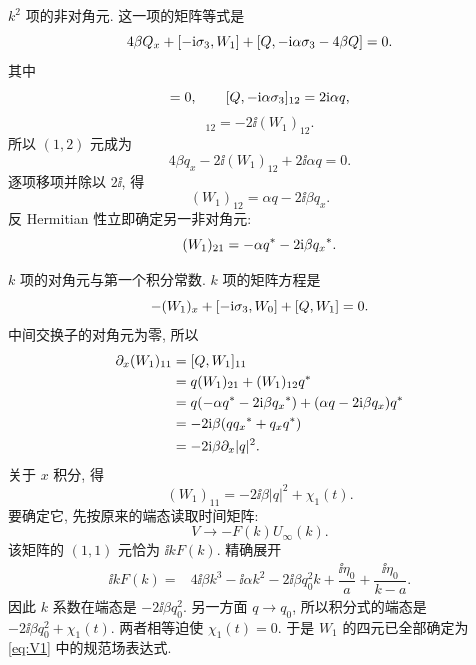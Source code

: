 \par\smallskip\noindent $k^2$ 项的非对角元.\quad
这一项的矩阵等式是
\begin{equation*}
4\beta Q_x+[-\mathrm{i}\sigma_3,W_1]+[Q,-\mathrm{i}\alpha\sigma_3-4\beta Q]=0.
\end{equation*}
其中
\begin{equation*}
[Q,-4\beta Q]=0,\qquad
[Q,-\ii\alpha\sg]_{12}=2\ii\alpha q,
\end{equation*}
\begin{equation*}
[-\ii\sg,W_1]_{12}=-2\ii(W_1)_{12}.
\end{equation*}
所以 $(1,2)$ 元成为
\begin{equation*}
4\beta q_x-2\ii(W_1)_{12}+2\ii\alpha q=0.
\end{equation*}
逐项移项并除以 $2\ii$, 得
\begin{equation*}
(W_1)_{12}=\alpha q-2\ii\beta q_x.
\end{equation*}
反 Hermitian 性立即确定另一非对角元:
\begin{equation*}
(W_1)_{21}=-\alpha{q}^{*}-2\mathrm{i}\beta{q_x}^{*}.
\end{equation*}

\par\smallskip\noindent $k$ 项的对角元与第一个积分常数.\quad
$k$ 项的矩阵方程是
\begin{equation*}
-(W_1)_x+[-\mathrm{i}\sigma_3,W_0]+[Q,W_1]=0.
\end{equation*}
中间交换子的对角元为零, 所以
\begin{equation*}
\begin{aligned}
\partial_x(W_1)_{11}
&=[Q,W_1]_{11}\\
&=q(W_1)_{21}+(W_1)_{12}{q}^{*}\\
&=q(-\alpha{q}^{*}-2\mathrm{i}\beta{q_x}^{*})
+(\alpha q-2\mathrm{i}\beta q_x){q}^{*}\\
&=-2\mathrm{i}\beta(q{q_x}^{*}+q_x{q}^{*})\\
&=-2\mathrm{i}\beta\partial_x|q|^2.
\end{aligned}
\end{equation*}
关于 $x$ 积分, 得
\begin{equation*}
(W_1)_{11}=-2\ii\beta|q|^2+\chi_1(t).
\end{equation*}
要确定它, 先按原来的端态读取时间矩阵:
\begin{equation*}
 V\longrightarrow-F(k)U_\infty(k).
\end{equation*}
该矩阵的 $(1,1)$ 元恰为 $\ii kF(k)$.
精确展开
\begin{equation*}
\begin{aligned}
\ii kF(k)
={}&4\ii\beta k^3-\ii\alpha k^2
-2\ii\beta q_0^2 k
+\dfrac{\ii\eta_0}{a}
+\dfrac{\ii\eta_0}{k-a}.
\end{aligned}
\end{equation*}
因此 $k$ 系数在端态是 $-2\ii\beta q_0^2$.
另一方面 $q\to q_0$, 所以积分式的端态是
$-2\ii\beta q_0^2+\chi_1(t)$.
两者相等迫使 $\chi_1(t)=0$.
于是 $W_1$ 的四元已全部确定为 \eqref{eq:V1} 中的规范场表达式.

